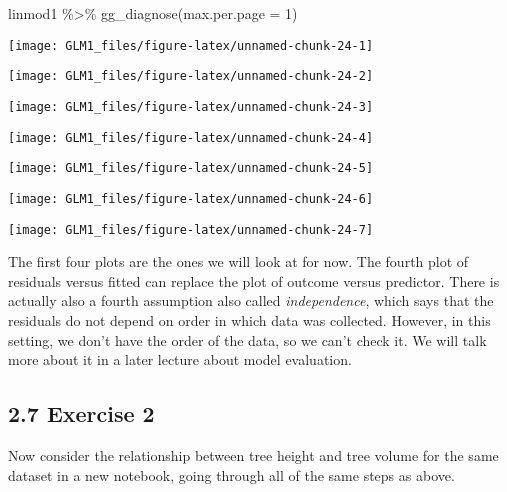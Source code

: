 \documentclass[
]{article}
\newenvironment{Shaded}{\begin{snugshade}}{\end{snugshade}}
\newcommand{\AttributeTok}[1]{\textcolor[rgb]{0.77,0.63,0.00}{#1}}
\newcommand{\DecValTok}[1]{\textcolor[rgb]{0.00,0.00,0.81}{#1}}
\newcommand{\FunctionTok}[1]{\textcolor[rgb]{0.00,0.00,0.00}{#1}}
\newcommand{\NormalTok}[1]{#1}
\newcommand{\SpecialCharTok}[1]{\textcolor[rgb]{0.00,0.00,0.00}{#1}}
\begin{document}
\begin{Shaded}
\begin{Highlighting}[]
\NormalTok{linmod1 }\SpecialCharTok{\%\textgreater{}\%}
  \FunctionTok{gg\_diagnose}\NormalTok{(}\AttributeTok{max.per.page =} \DecValTok{1}\NormalTok{)}
\end{Highlighting}
\end{Shaded}

\begin{center}\texttt{[image: GLM1\_files/figure-latex/unnamed-chunk-24-1]} \end{center}

\begin{center}\texttt{[image: GLM1\_files/figure-latex/unnamed-chunk-24-2]} \end{center}

\begin{center}\texttt{[image: GLM1\_files/figure-latex/unnamed-chunk-24-3]} \end{center}

\begin{center}\texttt{[image: GLM1\_files/figure-latex/unnamed-chunk-24-4]} \end{center}

\begin{center}\texttt{[image: GLM1\_files/figure-latex/unnamed-chunk-24-5]} \end{center}

\begin{center}\texttt{[image: GLM1\_files/figure-latex/unnamed-chunk-24-6]} \end{center}

\begin{center}\texttt{[image: GLM1\_files/figure-latex/unnamed-chunk-24-7]} \end{center}

The first four plots are the ones we will look at for now. The fourth
plot of residuals versus fitted can replace the plot of outcome versus
predictor. There is actually also a fourth assumption also called
\emph{independence}, which says that the residuals do not depend on
order in which data was collected. However, in this setting, we don't
have the order of the data, so we can't check it. We will talk more
about it in a later lecture about model evaluation.

\hypertarget{exercise-2}{%
\subsection{2.7 Exercise 2}\label{exercise-2}}

Now consider the relationship between tree height and tree volume for
the same dataset in a new notebook, going through all of the same steps
as above.
\end{document}
